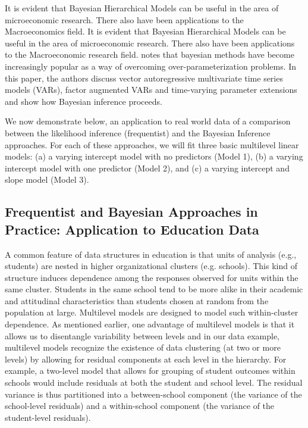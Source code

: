 It is evident that Bayesian Hierarchical Models can be useful in the area of microeconomic research. There also have been applications to the Macroeconomics field. It is evident that Bayesian Hierarchical Models can be useful in the area of microeconomic research. There also have been applications to the Macroeconomic research field. \cite{ koop2010bayesian} notes that bayesian methods have become increasingly popular as a way of overcoming over-parameterization problems. In this paper, the authors discuss vector autoregressive multivariate time
series models (VARs), factor augmented VARs and time-varying parameter extensions and show how Bayesian inference proceeds. 

We now demonstrate below, an application to real world data of a comparison between the likelihood inference (frequentist)  and the Bayesian Inference approaches. For each of these approaches, we will fit three basic multilevel linear models: (a) a varying intercept model with no predictors (Model 1), (b) a varying intercept model with one predictor (Model 2), and (c)  a varying intercept and slope model (Model 3).

 

\subsection{Frequentist and Bayesian Approaches in Practice: Application to Education Data}

A common feature of data structures in education is that units of analysis (e.g., students) are nested in higher organizational clusters (e.g. schools). This kind of structure induces dependence among the responses observed for units within the same cluster. Students in the same school tend to be more alike in their academic and attitudinal characteristics than students chosen at random from the population at large. Multilevel models are designed to model such within-cluster dependence. As mentioned earlier, one advantage of multilevel models is that it allows us to disentangle variability between levels and in our data example,  multilevel models recognize the existence of data clustering (at two or more levels) by allowing for residual components at each level in the hierarchy. For example, a two-level model that allows for grouping of student outcomes within schools would include residuals at both the student and school level. The residual variance is thus partitioned into a between-school component (the variance of the school-level residuals) and a within-school component (the variance of the student-level residuals). 


